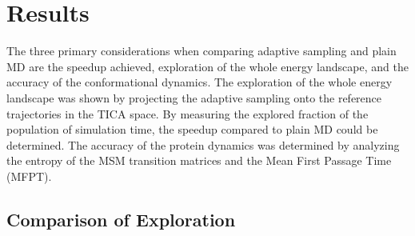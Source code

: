\begin{table}[H]

\centering
\caption{ExTASY parameters for MD and analysis, for both plain MD and adaptive sampling.  }\label{table:param1}
\end{table}


\section{\label{sec:results}Results}

The three primary considerations when comparing adaptive sampling and plain MD are the speedup achieved, exploration of the whole energy landscape, and the accuracy of the conformational dynamics.
The exploration of the whole energy landscape was shown by projecting the adaptive sampling onto the reference trajectories in the TICA space. By measuring the explored fraction of the population of simulation time, the speedup compared to plain MD could be determined. The accuracy of the protein dynamics was determined by analyzing the entropy of the MSM transition
matrices and the Mean First Passage Time (MFPT).



\subsection{\label{sec:time-fold}Comparison of Exploration}


